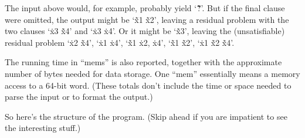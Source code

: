The input above would, for example, probably
yield `\.{\~\~?}'. But if the final clause were omitted, the output might be
`\.{\~x1} \.{\~x2}', leaving a residual problem with the two clauses
`\.{x3} \.{\~x4}' and `\.{x3} \.{x4}'.
Or it might be `\.{\~x3}', leaving the (unsatisfiable) residual
problem `\.{x2} \.{\~x4}', `\.{x1} \.{x4}', `\.{\~x1} \.{x2}, \.{x4}',
`\.{\~x1} \.{\~x2}', `\.{x1} \.{\~x2} \.{\~x4}'.

The running time in ``mems'' is also reported, together with the approximate
number of bytes needed for data storage. One ``mem'' essentially means a
memory access to a 64-bit word.
(These totals don't include the time or space needed to parse the
input or to format the output.)

\fi

So here's the structure of the program. (Skip ahead if you are
impatient to see the interesting stuff.)


